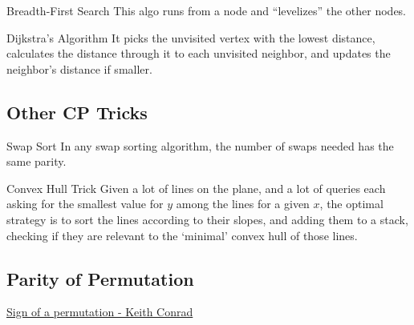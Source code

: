 {Breadth-First Search}{
    This algo runs from a node and ``levelizes'' the other nodes.
}


{Dijkstra's Algorithm}{
    It picks the unvisited vertex with the lowest distance, calculates
    the distance through it to each unvisited neighbor, and updates the neighbor's
    distance if smaller.
}


\subsection{Other CP Tricks}

\theo{}
{Swap Sort}{\label{theorem:swap_sort_steps_parity}
    In any swap sorting algorithm, the number of swaps needed has the same parity.
}



{Convex Hull Trick}{
    Given a lot of lines on the plane, and a lot of queries each asking for
    the smallest value for $ y $ among the lines for a given $ x $, the
    optimal strategy is to sort the lines according to their slopes, and
    adding them to a stack, checking if they are relevant to the `minimal'
    convex hull of those lines.
}



\subsection{Parity of Permutation}

\begin{myitemize}
    \item \href{https://kconrad.math.uconn.edu/blurbs/grouptheory/sign.pdf}{Sign
        of a permutation - Keith Conrad}
\end{myitemize}


